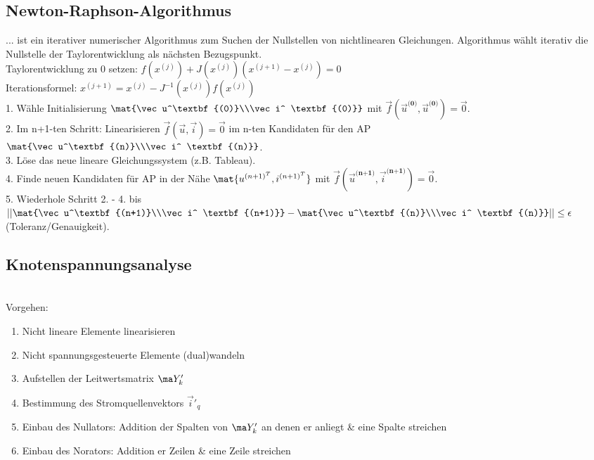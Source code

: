 \documentclass[fs, footer]{latex4ei}
\begin{document}
\begin{multicols*}{4}
	\subsection{Newton-Raphson-Algorithmus}
	... ist ein iterativer numerischer Algorithmus zum Suchen der Nullstellen von nichtlinearen Gleichungen. Algorithmus wählt iterativ die Nullstelle der Taylorentwicklung als nächsten Bezugspunkt.\\
	Taylorentwicklung zu 0 setzen: $f(x^{(j)}) + J(x^{(j)})(x^{(j+1)}-x^{(j)})=0$\\
	Iterationsformel: $x^{(j+1)} = x^{(j)} - J^{-1}(x^{(j)})f(x^{(j)})$\\
	1. Wähle Initialisierung $\mat{\vec u^\textbf{(0)}\\\vec i^ \textbf{(0)}}$ mit $\vec f(\vec u^\textbf{(0)}, \vec u^\textbf{(0)}) = \vec{0}$.\\
	2. Im n+1-ten Schritt: Linearisieren $\vec f(\vec u, \vec i) = \vec 0$ im n-ten Kandidaten für den AP $\mat{\vec u^\textbf{(n)}\\\vec i^ \textbf{(n)}}$.\\
	3. Löse das neue lineare Gleichungssystem (z.B. Tableau).\\
	4. Finde neuen Kandidaten für AP in der Nähe $\mat{u^{(n+1)^T}, i^{(n+1)^T}}$ mit $\vec f(\vec u^\textbf{(n+1)}, \vec i^ \textbf{(n+1)}) = \vec 0$.\\
	5. Wiederhole Schritt 2. - 4. bis $\left|\left|\mat{\vec u^\textbf{(n+1)}\\\vec i^ \textbf{(n+1)}}-\mat{\vec u^\textbf{(n)}\\\vec i^ \textbf{(n)}}\right|\right| \leq \epsilon$ (Toleranz/Genauigkeit).


	\subsection{Knotenspannungsanalyse}
\\
Vorgehen:
\begin{enumerate}\itemsep0pt
	\item Nicht lineare Elemente linearisieren
	\item Nicht spannungsgesteuerte Elemente (dual)wandeln
	\item Aufstellen der Leitwertsmatrix $\ma Y'_k$
	\item Bestimmung des Stromquellenvektors $\vec i'_q$
	\item Einbau des Nullators: Addition der Spalten von $\ma Y'_k$ an denen er anliegt \& eine Spalte streichen
	\item Einbau des Norators: Addition er Zeilen \& eine Zeile streichen


\end{enumerate}
\end{multicols*}
\end{document}
